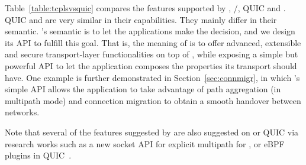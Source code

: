 Table~\ref{table:tcplsvsquic} compares the features supported by
\tcp, \tls/\tcp, QUIC and \tcpls. QUIC and \tcpls are very similar in their
capabilities. They mainly differ in their semantic. \tcpls's semantic is to let
the applications make the decision, and we design its API to fulfill this goal.
That is, the meaning of \tcpls is to offer advanced, extensible and secure
transport-layer functionalities on top of \tcp, while exposing a simple but
powerful API to let the application composes the properties its transport should
have. One example is further demonstrated in Section~\ref{sec:connmigr}, in
which \tcpls's simple API allows the application to take advantage of path
aggregation (in multipath mode) and connection migration to obtain
a smooth handover between networks.

Note that several of the features suggested by \tcpls are also suggested on \tcp or
QUIC via research works such as a new socket API for explicit multipath for
\tcp\cite{hesmans2016enhanced}, or eBPF plugins in
QUIC~\cite{de2019pluginizing}.

